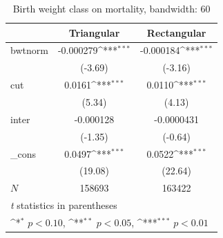 \documentclass[a4paper,11pt]{article}
\begin{document}
\begin{table}[htbp]\centering
\def\sym#1{\ifmmode^{#1}\else\(^{#1}\)\fi}
\caption{Birth weight class on mortality, bandwidth: 60}
\label{B1.bw60}
\begin{tabular}{l*{2}{c}}
\hline\hline
            &\multicolumn{1}{c}{Triangular}&\multicolumn{1}{c}{Rectangular}\\
\hline
bwtnorm     &   -0.000279\sym{***}&   -0.000184\sym{***}\\
            &     (-3.69)         &     (-3.16)         \\
[1em]
cut         &      0.0161\sym{***}&      0.0110\sym{***}\\
            &      (5.34)         &      (4.13)         \\
[1em]
inter       &   -0.000128         &  -0.0000431         \\
            &     (-1.35)         &     (-0.64)         \\
[1em]
\_cons      &      0.0497\sym{***}&      0.0522\sym{***}\\
            &     (19.08)         &     (22.64)         \\
\hline
\(N\)       &      158693         &      163422         \\
\hline\hline
\multicolumn{3}{l}{\footnotesize \textit{t} statistics in parentheses}\\
\multicolumn{3}{l}{\footnotesize \sym{*} \(p<0.10\), \sym{**} \(p<0.05\), \sym{***} \(p<0.01\)}\\
\end{tabular}
\end{table}


\end{document}
